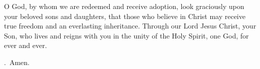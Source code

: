 \lettrine[lines=3]{O}{} God, by whom we are redeemed and receive adoption, 
look graciously upon your beloved sons and daughters,
that those who believe in Christ
may receive true freedom
and an everlasting inheritance.
Through our Lord Jesus Christ, your Son,
who lives and reigns with you in the unity of the Holy Spirit,
one God, for ever and ever. \par \Rbar.~Amen.
